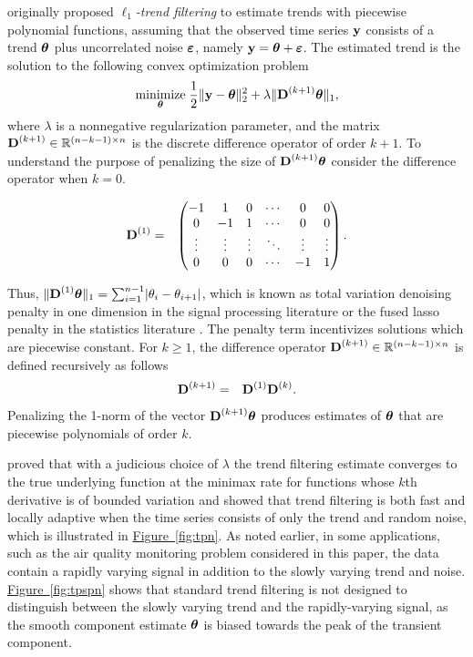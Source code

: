 \documentclass[aoas]{imsart}
\newcommand{\Fig}[1]{\hyperref[fig:#1]{Figure~\ref*{fig:#1}}} %
\newcommand{\Fig}[1]{{Figure~\ref{fig:#1}}} %
\newcommand{\Real}{\mathbb{R}}
\newcommand{\V}[1]{{\bm{\mathbf{\MakeLowercase{#1}}}}} %
\newcommand{\M}[1]{{\bm{\mathbf{\MakeUppercase{#1}}}}} %
\newcommand{\Mn}[2]{\M{#1}^{(#2)}} %
\begin{document}
\cite{Kim2009} originally proposed \textit{$\ell_1$-trend filtering} to estimate trends with piecewise polynomial functions, assuming that the observed time series $\V{y}$ consists of a trend $\V{\theta}$ plus uncorrelated noise $\V{\varepsilon}$, namely $\V{y} = \V{\theta} + \V{\varepsilon}$. The estimated trend is the solution to the following convex optimization problem
\begin{eqnarray*}
	\underset{\V{\theta}}{\text{minimize}}\; \frac{1}{2} \lVert \V{y} - \V{\theta} \rVert_2^2 + \lambda \lVert \Mn{D}{k+1}\V{\theta} \rVert_1,
\end{eqnarray*}
where $\lambda$ is a nonnegative regularization parameter, and the matrix $\Mn{D}{k+1} \in \Real^{(n - k -1) \times n}$ is the discrete difference operator of order $k+1$. To understand the purpose of penalizing the size of $\Mn{D}{k+1}\V{\theta}$ consider the difference operator when $k = 0$.

\begin{eqnarray*}
	\Mn{D}{1} & = & \begin{pmatrix}
		-1 & 1 & 0 & \cdots & 0 & 0 \\
		0 & -1 & 1 & \cdots & 0 & 0 \\
		\vdots & \vdots & \vdots & \ddots & \vdots & \vdots \\
		0 & 0 & 0 & \cdots & -1 & 1 \\
	\end{pmatrix}.
\end{eqnarray*}

Thus, $\lVert \Mn{D}{1}\V{\theta} \rVert_1 = \sum_{i=1}^{n-1} \lvert \theta_i - \theta_{i+1} \rvert$, which is known as total variation denoising penalty in one dimension in the signal processing literature \citep{Rudin1992} or the fused lasso penalty in the statistics literature \citep{Tibshirani2005}. The penalty term incentivizes solutions which are piecewise constant. For $k \geq 1$, the difference operator $\Mn{D}{k+1} \in \Real^{(n-k-1) \times n}$ is defined recursively as follows
\begin{eqnarray*}
	\Mn{D}{k+1} & = & \Mn{D}{1}\Mn{D}{k}.
\end{eqnarray*}
Penalizing the 1-norm of the vector $\Mn{D}{k+1}\V{\theta}$ produces estimates of $\V{\theta}$ that are piecewise polynomials of order $k$.

\cite{Tib2014} proved that with a judicious choice of $\lambda$ the trend filtering estimate converges to the true underlying function at the minimax rate for functions whose $k$th derivative is of bounded variation and showed that trend filtering is both fast and locally adaptive when the time series consists of only the trend and random noise, which is illustrated in \Fig{tpn}. As noted earlier, in some applications, such as the air quality monitoring problem considered in this paper, the data contain a rapidly varying signal in addition to the slowly varying trend and noise. \Fig{tpspn} shows that standard trend filtering is not designed to distinguish between the slowly varying trend and the rapidly-varying signal, as the smooth component estimate $\V{\theta}$ is biased towards the peak of the transient component.
\end{document}
